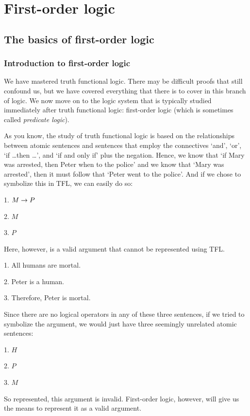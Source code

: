 \graphicspath{{figures--proofs/}}
\part{First-order logic}
\label{ch.FOL}

\chapter{The basics of first-order logic}\label{FOL-basics}

\section{Introduction to first-order logic}

We have mastered truth functional logic. There may be difficult proofs that still confound us, but we have covered everything that there is to cover in this branch of logic. We now move on to the logic system that is typically studied immediately after truth functional logic: first-order logic (which is sometimes called \textit{predicate logic}). 

As you know, the study of truth functional logic is based on the relationships between atomic sentences and sentences that employ the connectives `and', `or', `if \ldots then \ldots', and `if and only if' plus the negation. Hence, we know that `if Mary was arrested, then Peter when to the police' and we know that `Mary was arrested', then it must follow that `Peter went to the police'. And if we chose to symbolize this in TFL, we can easily do so:
\begin{earg}
\item[1.] $M \rightarrow P$
\item[2.] $M$
\item[3.] $P$
\end{earg}
Here, however, is a valid argument that cannot be represented using TFL.
\begin{earg}
\item[1.] All humans are mortal.
\item[2.] Peter is a human.
\item[3.] Therefore, Peter is mortal. 
\end{earg}
Since there are no logical operators in any of these three sentences, if we tried to symbolize the argument, we would just have three seemingly unrelated atomic sentences:
\begin{earg}
\item[1.] $H$
\item[2.] $P$
\item[3.] $M$
\end{earg}
So represented, this argument is invalid. First-order logic, however, will give us the means to represent it as a valid argument.


